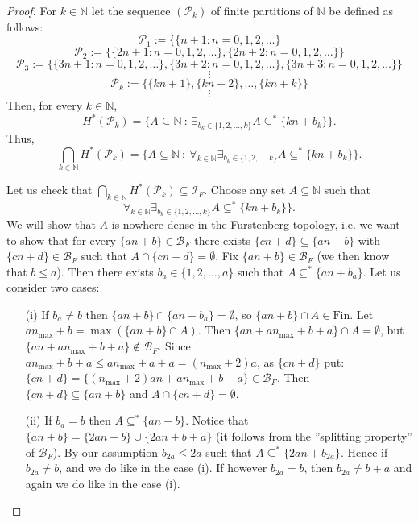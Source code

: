 \documentclass{amsart}
\theoremstyle{definition}
\theoremstyle{definition}
\newcommand{\N}{{\mathbb N}}
\newcommand{\Fin}{\textrm{Fin}}
\newcommand{\I}{\mathcal I}
\newcommand{\B}{\mathcal{B}}
\DeclareMathOperator{\Exists}{\exists}
\DeclareMathOperator{\Forall}{\forall}
\begin{document}
\begin{proof}
For $k\in\N$ 
let the sequence $(\mathcal{P}_k)$ of finite partitions of $\N$ be defined as follows:\\
$$\mathcal{P}_1 := \{\{n+1\colon n = 0,1,2,\ldots\}$$
$$\mathcal{P}_2 := \{\{2n+1\colon n = 0,1,2,\ldots\},
 \{2n+2\colon n = 0,1,2,\ldots\}\}$$
$$\mathcal{P}_3 := \{\{3n+1\colon n = 0,1,2,\ldots\},
 \{3n+2\colon n = 0,1,2,\ldots\}, \{3n+3\colon n = 0,1,2,\ldots\}\}$$
$$\vdots$$
$$\mathcal{P}_k := \{\{kn+1\}, \{kn+2\}, \ldots, \{kn+k\}\}$$
$$\vdots$$
Then, for every $k\in\N$, 
$$H^{*}(\mathcal{P}_k)= \{A\subseteq\N \ :\ \Exists_{b_k\in\{1,2,\ldots,k\}} A\subseteq^* \{kn+b_k\}\}.$$
Thus,
$$\bigcap_{k\in\N} H^{*}(\mathcal{P}_k)= \{A\subseteq\N \ :\ \Forall_{k\in\N}\Exists_{b_k\in\{1,2,\ldots,k\}} A\subseteq^* \{kn+b_k\}\}.$$

Let us check that $\bigcap_{k\in\N} H^{*}(\mathcal{P}_k)\subseteq\I_F$. 
Choose any set $A\subseteq\N$ such that 
$$\Forall_{k\in\N}\Exists_{b_k\in\{1,2,\ldots,k\}} A\subseteq^* \{kn+b_k\}\}.$$ 
We will show that $A$ is nowhere dense in the Furstenberg 
topology, i.e. we want to show that for every $\{an+b\}\in \B_F$ there exists $\{cn+d\}\subseteq \{an+b\}$ with $\{cn+d\}\in \B_F$ such that $A\cap \{cn+d\} = \emptyset$. Fix $\{an+b\}\in \B_F$ (we then know that $b\leq a$). Then there exists $b_a\in\{1,2,\ldots,a\}$ 
such that $A\subseteq^* \{an+b_a\}$. Let us consider two cases:
\begin{itemize}
	\item[(i)] If $b_a\neq b$ then $\{an+b\} \cap \{an+b_a\} = \emptyset$, so $\{an+b\}\cap A \in\Fin$. Let  $an_{\textrm{max}}+b=\max(\{an+b\}\cap A)$. Then $\{an+an_{\max}+b+a\} \cap A = \emptyset$, but $\{an+an_{\max}+b+a\}\notin \B_F$. Since $an_{\max}+b+a \leq an_{\max}+a+a = (n_{\max}+2)a$, as $\{cn+d\}$ put: $\{cn+d\} = \{(n_{\max}+2)an+an_{\max}+b+a\}\in \B_F$. Then $\{cn+d\}\subseteq \{an+b\}$ and $A\cap \{cn+d\} = \emptyset$.
	\item[(ii)] If $b_a = b$ then $A\subseteq^* \{an+b\}$. Notice that $\{an+b\}=\{2an+b\}\cup \{2an+b+a\}$ (it follows from the ''splitting property'' of $\B_F$). 
By our assumption $b_{2a}\leq 2a$ such that $A\subseteq^* \{2an+b_{2a}\}$. Hence if $b_{2a} \neq b$, and 
we do like in the case (i). If however $b_{2a}=b$, then $b_{2a}\neq b+a$ and again we do like in the case (i).
\end{itemize}

\end{proof}
\end{document}

